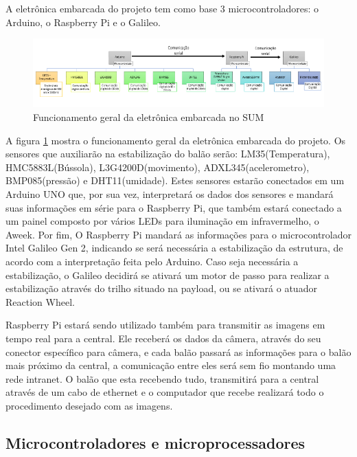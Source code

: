 A eletrônica embarcada do projeto tem como base 3 microcontroladores: o Arduino, o Raspberry Pi e o Galileo.

\begin{figure}[H]
	\centering
	\includegraphics[width=1\textwidth]{figuras/eletronicaembarcadasum}
	\caption{Funcionamento geral da eletrônica embarcada no SUM}
	\label{img:eletronicaembarcadasum}
\end{figure}

A figura \ref{img:eletronicaembarcadasum} mostra o funcionamento geral da eletrônica embarcada do projeto. Os sensores que auxiliarão na estabilização do balão serão: LM35(Temperatura), HMC5883L(Bússola), L3G4200D(movimento), ADXL345(acelerometro), BMP085(pressão) e DHT11(umidade). Estes sensores estarão conectados em um Arduino UNO que, por sua vez, interpretará os dados dos sensores e mandará suas informações em série para o Raspberry Pi, que também estará conectado a um painel composto por vários LEDs para iluminação em infravermelho, o Aweek. Por fim, O Raspberry Pi mandará as informações para o microcontrolador Intel Galileo Gen 2, indicando se será necessária a estabilização da estrutura, de acordo com a interpretação feita pelo Arduino. Caso seja necessária a estabilização, o Galileo decidirá se ativará um motor de passo para realizar a estabilização através do trilho situado na payload, ou se ativará o atuador Reaction Wheel.

Raspberry Pi estará sendo utilizado também para transmitir as imagens em tempo real para a central. Ele receberá os dados da câmera, através do seu conector específico para câmera, e cada balão passará as informações para o balão mais próximo da central, a comunicação entre eles será sem fio montando uma rede intranet. O balão que esta recebendo tudo, transmitirá para a central através de um cabo de ethernet e o computador que recebe realizará todo o procedimento desejado com as imagens.

\subsection{Microcontroladores e microprocessadores}

